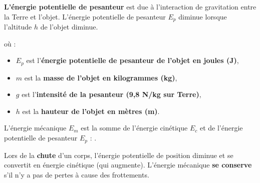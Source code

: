 \documentclass[11pt,a4paper]{article}
\begin{document}
\vspace{6pt}


\textbf{L'énergie potentielle de pesanteur} est due à l'interaction de gravitation entre la Terre et l'objet. L'énergie potentielle de pesanteur $E_p$ diminue lorsque l'altitude $h$ de l'objet diminue.

\begin{center}
    \LARGE{}
\end{center}

où :
\begin{itemize}
    \item $E_p$ est l'\textbf{énergie potentielle de pesanteur de l'objet en joules (J)},
    \item $m$ est la \textbf{masse de l'objet en kilogrammes (kg)},
    \item $g$ est l'\textbf{intensité de la pesanteur (9,8 N/kg sur Terre)},
    \item $h$ est la \textbf{hauteur de l'objet en mètres (m)}.
\end{itemize}

\vspace{6pt}


\newpage

L'énergie mécanique $E_m$ est la somme de l'énergie cinétique $E_c$ et de l'énergie potentielle de pesanteur $E_p$ : .

Lors de la \textbf{chute} d’un corps, l’énergie potentielle de position diminue et se convertit en énergie cinétique (qui augmente). L’énergie mécanique \textbf{se conserve} s’il n’y a pas de pertes à cause des frottements.

\end{document}
